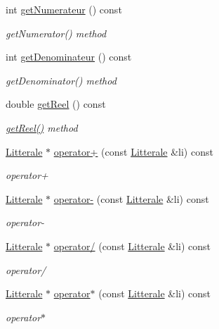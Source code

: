 \begin{DoxyCompactItemize}
int \hyperlink{class_li_expression_a5a4547ae8674412134264a8cd436e938}{get\+Numerateur} () const 
\begin{DoxyCompactList}\small\item\em get\+Numerator() method \end{DoxyCompactList}\item 
int \hyperlink{class_li_expression_ab0c4fc0767e78b313d2ac4741bc9a8e7}{get\+Denominateur} () const 
\begin{DoxyCompactList}\small\item\em get\+Denominator() method \end{DoxyCompactList}\item 
double \hyperlink{class_li_expression_a6810603f331aa6a054df4e4d9f64ba4a}{get\+Reel} () const 
\begin{DoxyCompactList}\small\item\em \hyperlink{class_li_expression_a6810603f331aa6a054df4e4d9f64ba4a}{get\+Reel()} method \end{DoxyCompactList}\item 
\hyperlink{class_litterale}{Litterale} $\ast$ \hyperlink{class_li_expression_aba0fbbab32512bad7e67aa23d2e50318}{operator+} (const \hyperlink{class_litterale}{Litterale} \&li) const 
\begin{DoxyCompactList}\small\item\em operator+ \end{DoxyCompactList}\item 
\hyperlink{class_litterale}{Litterale} $\ast$ \hyperlink{class_li_expression_a459ed09d7f610ff88e606fc95e0b22a5}{operator-\/} (const \hyperlink{class_litterale}{Litterale} \&li) const 
\begin{DoxyCompactList}\small\item\em operator-\/ \end{DoxyCompactList}\item 
\hyperlink{class_litterale}{Litterale} $\ast$ \hyperlink{class_li_expression_a6d6c07034ea7c50301164e27d1af48fc}{operator/} (const \hyperlink{class_litterale}{Litterale} \&li) const 
\begin{DoxyCompactList}\small\item\em operator/ \end{DoxyCompactList}\item 
\hyperlink{class_litterale}{Litterale} $\ast$ \hyperlink{class_li_expression_a14d8c244f1d0a5035781e999220f6972}{operator$\ast$} (const \hyperlink{class_litterale}{Litterale} \&li) const 
\begin{DoxyCompactList}\small\item\em operator$\ast$ \end{DoxyCompactList}\item 

\end{DoxyCompactItemize}
